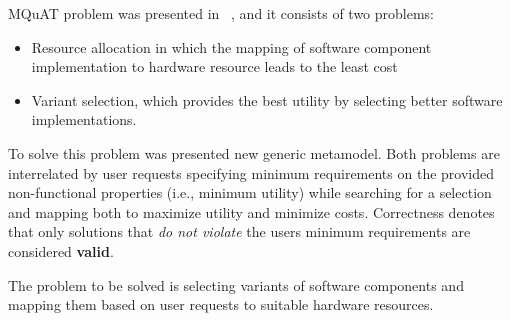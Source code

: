 MQuAT problem was presented in ~\cite{gotz18}, and it consists of two problems:

\begin{itemize}
	\item Resource allocation in which the mapping of software component implementation to hardware resource leads to the least cost
	\item Variant selection, which provides the best utility by selecting better software implementations.
\end{itemize} 

To solve this problem was presented new generic metamodel. Both problems are interrelated by user requests specifying minimum requirements on the provided non-functional properties (i.e., minimum utility) while searching for a selection and mapping both to maximize utility and minimize costs. Correctness denotes that only solutions that \textit{do not violate} the users minimum requirements are considered \textbf{valid}.

The problem to be solved is selecting variants of software components and mapping them based on user requests to suitable hardware resources.

